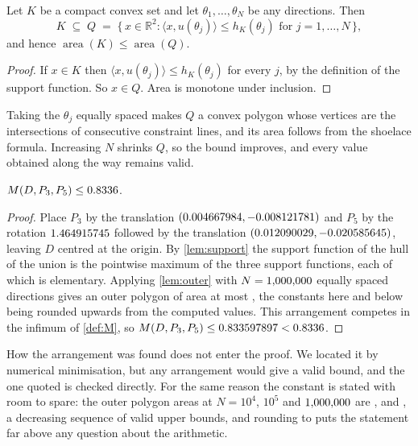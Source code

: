 \documentclass[a4paper,UKenglish,cleveref,autoref,thm-restate,numberwithinsect]{lipics-v2021}
\begin{document}
\begin{lemma}
\label{lem:outer}
Let $K$ be a compact convex set and let $\theta_1,\dots,\theta_N$ be any
directions. Then
\[
  K \;\subseteq\; Q \;=\;
  \bigl\{\,x\in\mathbb{R}^2 : \langle x,u(\theta_j)\rangle\le h_K(\theta_j)
  \text{ for } j=1,\dots,N \,\bigr\},
\]
and hence $\operatorname{area}(K)\le\operatorname{area}(Q)$.
\end{lemma}

\begin{proof}
If $x\in K$ then $\langle x,u(\theta_j)\rangle\le h_K(\theta_j)$ for every $j$, by
the definition of the support function. So $x\in Q$. Area is monotone under
inclusion.
\end{proof}

Taking the $\theta_j$ equally spaced makes $Q$ a convex polygon whose vertices are
the intersections of consecutive constraint lines, and its area follows from the
shoelace formula. Increasing $N$ shrinks $Q$, so the bound improves, and every
value obtained along the way remains valid.

\begin{proposition}
\label{prop:ceiling}
$M(D,P_3,P_5) \le 0.8336$.
\end{proposition}

\begin{proof}
Place $P_3$ by the translation $(0.004667984,-0.008121781)$ and $P_5$ by the rotation
$1.464915745$ followed by the translation $(0.012090029,-0.020585645)$, leaving $D$
centred at the origin. By
\cref{lem:support} the support function of the hull of the union is the pointwise
maximum of the three support functions, each of which is elementary. Applying
\cref{lem:outer} with $N=1{,}000{,}000$ equally spaced directions gives an outer
polygon of area at most \ClassicalOuterC{}, the constants here and below being
rounded upwards from the computed values. This arrangement competes in the
infimum of \cref{def:M}, so
$M(D,P_3,P_5)\le0.833597897<0.8336$.
\end{proof}

\begin{remark}
\label{rem:provenance}
How the arrangement was found does not enter the proof. We located it by
numerical minimisation, but any arrangement would give a valid bound, and the one
quoted is checked directly. For the same reason the constant is stated with room
to spare: the outer polygon areas at $N=10^4$, $10^5$ and $1{,}000{,}000$ are
\ClassicalOuterA{}, \ClassicalOuterB{} and \ClassicalOuterC{}, a decreasing
sequence of valid upper bounds, and rounding to \ClassicalCeilingSafe{} puts the
statement far above any question about the arithmetic.
\end{remark}
\end{document}

